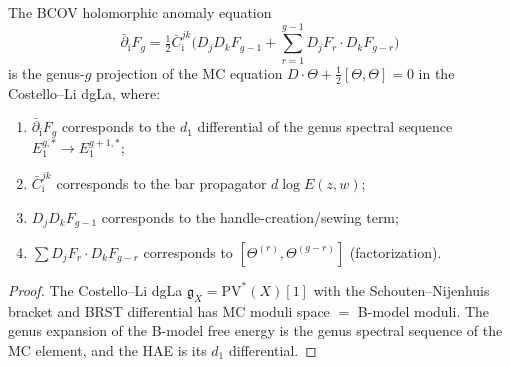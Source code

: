 \begin{theorem}[HAE \texorpdfstring{$=$}{=} MC genus spectral sequence, structural identification]
\label{thm:hae-mc-structural}
The BCOV holomorphic anomaly equation
\[
 \bar{\partial}_{\bar{\imath}} F_g = \tfrac{1}{2} \bar{C}^{jk}_{\bar{\imath}}
 \bigl(D_j D_k F_{g-1} + \textstyle\sum_{r=1}^{g-1} D_j F_r \cdot D_k F_{g-r}\bigr)
\]
is the genus-$g$ projection of the MC equation $D \cdot \Theta + \tfrac{1}{2}[\Theta, \Theta] = 0$ in the Costello--Li dgLa, where:
\begin{enumerate}[label=\textup{(\roman*)}]
 \item $\bar{\partial}_{\bar{\imath}} F_g$ corresponds to the $d_1$ differential of the genus spectral sequence $E_1^{g,*} \to E_1^{g+1,*}$;
 \item $\bar{C}^{jk}_{\bar{\imath}}$ corresponds to the bar propagator $d\log E(z,w)$;
 \item $D_j D_k F_{g-1}$ corresponds to the handle-creation/sewing term;
 \item $\sum D_j F_r \cdot D_k F_{g-r}$ corresponds to $[\Theta^{(r)}, \Theta^{(g-r)}]$ (factorization).
\end{enumerate}
\end{theorem}

\begin{proof}
The Costello--Li dgLa $\mathfrak{g}_X = \mathrm{PV}^*(X)[1]$ with the Schouten--Nijenhuis bracket and BRST differential has MC moduli space $= $ B-model moduli. The genus expansion of the B-model free energy is the genus spectral sequence of the MC element, and the HAE is its $d_1$ differential.
\end{proof}

